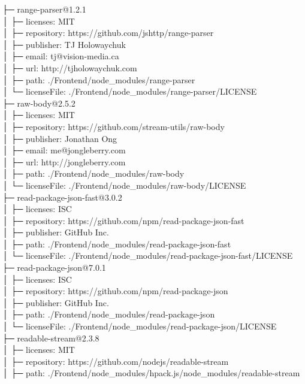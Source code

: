 ├─ range-parser@1.2.1\\
│  ├─ licenses: MIT\\
│  ├─ repository: https://github.com/jshttp/range-parser\\
│  ├─ publisher: TJ Holowaychuk\\
│  ├─ email: tj@vision-media.ca\\
│  ├─ url: http://tjholowaychuk.com\\
│  ├─ path: ./Frontend/node\_modules/range-parser\\
│  └─ licenseFile: ./Frontend/node\_modules/range-parser/LICENSE\\
├─ raw-body@2.5.2\\
│  ├─ licenses: MIT\\
│  ├─ repository: https://github.com/stream-utils/raw-body\\
│  ├─ publisher: Jonathan Ong\\
│  ├─ email: me@jongleberry.com\\
│  ├─ url: http://jongleberry.com\\
│  ├─ path: ./Frontend/node\_modules/raw-body\\
│  └─ licenseFile: ./Frontend/node\_modules/raw-body/LICENSE\\
├─ read-package-json-fast@3.0.2\\
│  ├─ licenses: ISC\\
│  ├─ repository: https://github.com/npm/read-package-json-fast\\
│  ├─ publisher: GitHub Inc.\\
│  ├─ path: ./Frontend/node\_modules/read-package-json-fast\\
│  └─ licenseFile: ./Frontend/node\_modules/read-package-json-fast/LICENSE\\
├─ read-package-json@7.0.1\\
│  ├─ licenses: ISC\\
│  ├─ repository: https://github.com/npm/read-package-json\\
│  ├─ publisher: GitHub Inc.\\
│  ├─ path: ./Frontend/node\_modules/read-package-json\\
│  └─ licenseFile: ./Frontend/node\_modules/read-package-json/LICENSE\\
├─ readable-stream@2.3.8\\
│  ├─ licenses: MIT\\
│  ├─ repository: https://github.com/nodejs/readable-stream\\
│  ├─ path: ./Frontend/node\_modules/hpack.js/node\_modules/readable-stream\\
